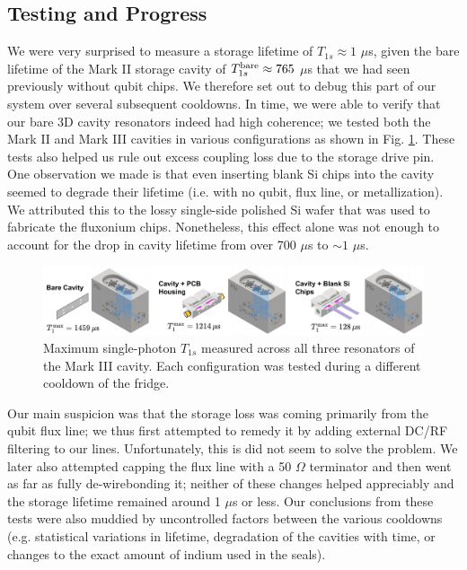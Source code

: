 \subsection{Testing and Progress}
We were very surprised to measure a storage lifetime of $T_{1s} \approx 1$ $\mu$s, given the bare lifetime of the Mark II storage cavity of $T_{1s}^{\rm bare} \approx 765$ $\mu$s that we had seen previously without qubit chips. We therefore set out to debug this part of our system over several subsequent cooldowns. In time, we were able to verify that our bare 3D cavity resonators indeed had high coherence; we tested both the Mark II and Mark III cavities in various configurations as shown in Fig. \ref{fig:4_3D_Cavity_Debugging}. These tests also helped us rule out excess coupling loss due to the storage drive pin. One observation we made is that even inserting blank Si chips into the cavity seemed to degrade their lifetime (i.e. with no qubit, flux line, or metallization). We attributed this to the lossy single-side polished Si wafer that was used to fabricate the fluxonium chips. Nonetheless, this effect alone was not enough to account for the drop in cavity lifetime from over 700 $\mu$s to $\sim\!1$ $\mu$s. 

\begin{figure}[t]
    \centering
    \includegraphics[width=\linewidth]{Figures/4/3D_Cavity_Debugging.pdf}
    \caption{Maximum single-photon $T_{1s}$ measured across all three resonators of the Mark III cavity. Each configuration was tested during a different cooldown of the fridge.}
    \label{fig:4_3D_Cavity_Debugging}
\end{figure}

Our main suspicion was that the storage loss was coming primarily from the qubit flux line; we thus first attempted to remedy it by adding external DC/RF filtering to our lines. Unfortunately, this is did not seem to solve the problem. We later also attempted capping the flux line with a 50 $\Omega$ terminator and then went as far as fully de-wirebonding it; neither of these changes helped appreciably and the storage lifetime remained around 1 $\mu$s or less. Our conclusions from these tests were also muddied by uncontrolled factors between the various cooldowns (e.g. statistical variations in lifetime, degradation of the cavities with time, or changes to the exact amount of indium used in the seals). 

